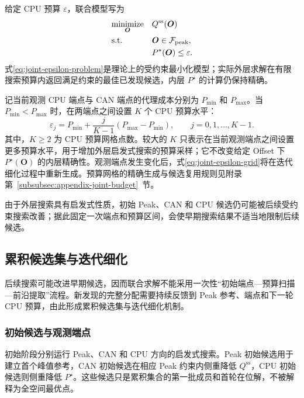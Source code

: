 \documentclass[UTF8,a4paper,twoside,zihao=-4]{ctexart}
\numberwithin{equation}{section}
\numberwithin{figure}{section}
\numberwithin{table}{section}
\theoremstyle{definition}
\newcommand{\Fset}{\mathcal{F}}
\numberwithin{algocf}{section}
\begin{document}
给定 CPU 预算 $\varepsilon$，联合模型写为
\begin{equation}
 \begin{aligned}
  &\underset{\boldsymbol O}{\operatorname{minimize}}
  && Q^{\mathrm{ss}}(\boldsymbol O)\\
  &\textnormal{s.t.}
  && \boldsymbol O\in\Fset_{\rm peak},\\
  &&& P^\star(\boldsymbol O)\le\varepsilon.
 \end{aligned}
\label{eq:joint-epsilon-problem}
\end{equation}
式\eqref{eq:joint-epsilon-problem}是理论上的受约束最小化模型；实际外层求解在有限搜索预算内返回满足约束的最佳已发现候选，内层 $P^\star$ 的计算仍保持精确。

记当前观测 CPU 端点与 CAN 端点的代理成本分别为 $P_{\min}$ 和 $P_{\max}$。当 $P_{\min}<P_{\max}$ 时，在两端点之间设置 $K$ 个 CPU 预算水平：
\begin{equation}
 \varepsilon_j
 =
 P_{\min}
 +
 \frac{j}{K-1}
 \left(P_{\max}-P_{\min}\right),
 \qquad j=0,1,\ldots,K-1.
\label{eq:joint-epsilon-grid}
\end{equation}
其中，$K\ge2$ 为 CPU 预算网格点数。较大的 $K$ 只表示在当前观测端点之间设置更多预算水平，用于增加外层启发式搜索的预算采样；它不改变给定 Offset 下 $P^\star(\boldsymbol O)$ 的内层精确性。观测端点发生变化后，式\eqref{eq:joint-epsilon-grid}将在迭代细化过程中重新生成。预算网格的精确生成与候选复用规则见附录第~\ref{subsubsec:appendix-joint-budget}~节。

由于外层搜索具有启发式性质，初始 Peak、CAN 和 CPU 候选仍可能被后续受约束搜索改善；据此固定一次端点和预算区间，会使早期搜索结果不适当地限制后续候选。

\subsection{累积候选集与迭代细化}
\label{subsec:joint-archive-refinement}

后续搜索可能改进早期候选，因而联合求解不能采用一次性“初始端点—预算扫描—前沿提取”流程。新发现的完整分配需要持续反馈到 Peak 参考、端点和下一轮 CPU 预算，由此形成累积候选集与迭代细化机制。

\subsubsection{初始候选与观测端点}
\label{subsubsec:initial-anchors-observed-endpoints}

初始阶段分别运行 Peak、CAN 和 CPU 方向的启发式搜索。Peak 初始候选用于建立首个峰值参考，CAN 初始候选在相应 Peak 约束内侧重降低 $Q^{\mathrm{ss}}$，CPU 初始候选则侧重降低 $P^\star$。这些候选只是累积集合的第一批成员和首轮在位解，不被解释为全空间最优点。
\end{document}
